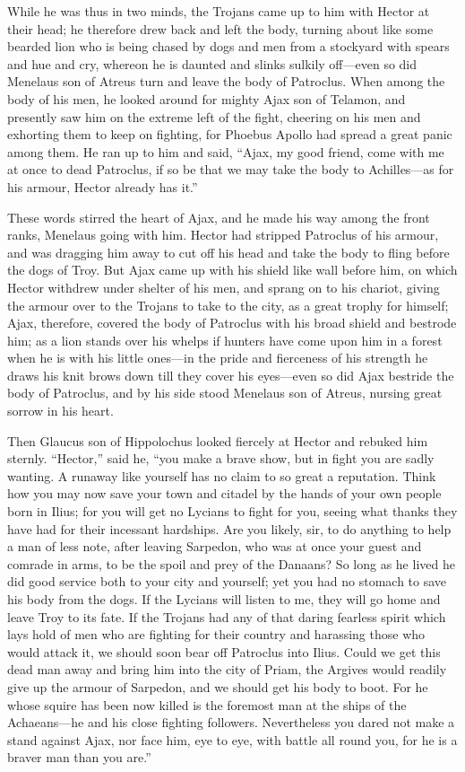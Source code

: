 While he was thus in two minds, the Trojans came up to him with Hector at
their head; he therefore drew back and left the body, turning about like
some bearded lion who is being chased by dogs and men from a stockyard
with spears and hue and cry, whereon he is daunted and slinks sulkily off—even
so did Menelaus son of Atreus turn and leave the body of Patroclus. When
among the body of his men, he looked around for mighty Ajax son of
Telamon, and presently saw him on the extreme left of the fight, cheering
on his men and exhorting them to keep on fighting, for Phoebus Apollo had
spread a great panic among them. He ran up to him and said, “Ajax, my good
friend, come with me at once to dead Patroclus, if so be that we may take
the body to Achilles—as for his armour, Hector already has it.”

These words stirred the heart of Ajax, and he made his way among the front
ranks, Menelaus going with him. Hector had stripped Patroclus of his
armour, and was dragging him away to cut off his head and take the body to
fling before the dogs of Troy. But Ajax came up with his shield like wall
before him, on which Hector withdrew under shelter of his men, and sprang
on to his chariot, giving the armour over to the Trojans to take to the
city, as a great trophy for himself; Ajax, therefore, covered the body of
Patroclus with his broad shield and bestrode him; as a lion stands over
his whelps if hunters have come upon him in a forest when he is with his
little ones—in the pride and fierceness of his strength he draws his
knit brows down till they cover his eyes—even so did Ajax bestride
the body of Patroclus, and by his side stood Menelaus son of Atreus,
nursing great sorrow in his heart.

Then Glaucus son of Hippolochus looked fiercely at Hector and rebuked him
sternly. “Hector,” said he, “you make a brave show, but in fight you are
sadly wanting. A runaway like yourself has no claim to so great a
reputation. Think how you may now save your town and citadel by the hands
of your own people born in Ilius; for you will get no Lycians to fight for
you, seeing what thanks they have had for their incessant hardships. Are
you likely, sir, to do anything to help a man of less note, after leaving
Sarpedon, who was at once your guest and comrade in arms, to be the spoil
and prey of the Danaans? So long as he lived he did good service both to
your city and yourself; yet you had no stomach to save his body from the
dogs. If the Lycians will listen to me, they will go home and leave Troy
to its fate. If the Trojans had any of that daring fearless spirit which
lays hold of men who are fighting for their country and harassing those
who would attack it, we should soon bear off Patroclus into Ilius. Could
we get this dead man away and bring him into the city of Priam, the
Argives would readily give up the armour of Sarpedon, and we should get
his body to boot. For he whose squire has been now killed is the foremost
man at the ships of the Achaeans—he and his close fighting
followers. Nevertheless you dared not make a stand against Ajax, nor face
him, eye to eye, with battle all round you, for he is a braver man than
you are.”

